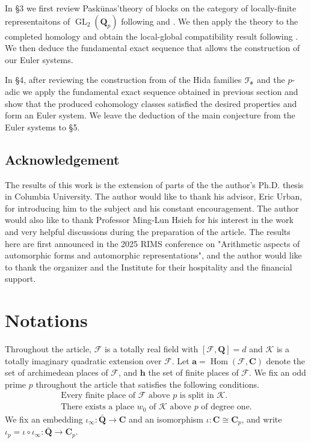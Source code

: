 \documentclass[leqno]{amsart}
\theoremstyle{definition}
\theoremstyle{remark}
\newcommand{\Q}{{\mathbf{Q}}}
\newcommand{\C}{\mathbf C}
\newcommand{\arch}{\mathbf{a}}
\newcommand{\finite}{\mathbf{h}}
\DeclareMathOperator{\Hom}{Hom}
\DeclareMathOperator{\GL}{GL}
\newcommand{\fs}{\mathfrak{s}}
\newcommand{\F}{{\mathcal{F}}} %
\newcommand{\K}{{\mathcal{K}}} %
\newcommand{\euF}{\EuScript{F}} %
\begin{document}
In \S 3 we first review Pask\={u}nas'theory
of blocks on the category of locally-finite representaitons
of $\GL_2(\Q_p)$ following \cite{pask} and \cite{urban}.
We then apply the theory
to the completed homology and 
obtain the local-global compatibility result following \cite{pan}.
We then deduce the fundamental exact sequence
that allows the construction of our Euler systems.

In \S 4,
after reviewing the construction from \cite{lee}
of the Hida families $\euF_\fs$
and the $p$-adic 
we apply the fundamental exact sequence obtained
in previous section and show that 
the produced cohomology classes
satisfied the desired properties
and form an Euler system.
We leave the deduction of the main conjecture
from the Euler systems to \S 5.

\subsection*{Acknowledgement}

The results of this work is the extension of parts of the the author's Ph.D. thesis in Columbia University.
The author would like to thank his advisor, Eric Urban, for introducing him to the subject and his constant encouragement.
The author would also like to thank Professor Ming-Lun Hsieh for his 
interest in the work and very helpful discussions during the preparation 
of the article.
The results here are first announced in the 2025
RIMS conference on
"Arithmetic aspects of automorphic forms and automorphic representations",
and the author would like to thank the organizer and the Institute
for their hospitality and the financial support.




\section{Notations}

Throughout the article, $\F$ is a totally real field 
with $[\F,\Q]=d$
and $\K$ is a totally imaginary quadratic extension over $\F$.
Let $\arch=\Hom(\F, \C)$ 
denote the set of archimedean places of $\F$,
and $\finite$ the set of finite places of $\F$.
We fix an odd prime $p$ throughout the article
that satisfies the following conditions.
\begin{align}\label{cond:ord}\tag{ord}
\text{Every finite place of $\F$ above $p$ is split in $\K$}.\\
\label{cond:deg}\tag{deg}
\text{There exists a place $w_0$ of $\K$ above $p$ of degree one}.
\end{align}
We fix an embedding $\iota_\infty:\bar{\Q}\to \C$
and an isomorphism $\iota:\C\cong \C_p$,
and write $\iota_p=\iota\circ\iota_\infty:\bar{\Q}\to \C_p$.
\end{document}
